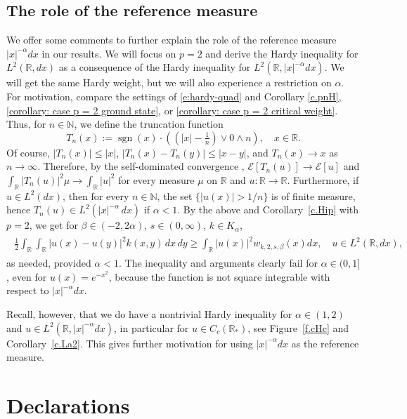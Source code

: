 \documentclass[12pt, a4paper]{amsart}
\newcommand{\R}{\mathbb{R}}
\newcommand{\E}{\mathcal{E}}
\begin{document}
\subsection{The role of the reference measure}\label{ss.uorm}
We offer some comments to further explain the role of the reference measure $|x|^{-\alpha}dx$ in our results. %
We will focus on $p=2$ and derive the Hardy inequality for $L^2(\R,dx)$ as a consequence of the Hardy inequality for $L^2(\R, |x|^{-\alpha}dx)$. We will get the same Hardy weight, but we will also experience a restriction on $\alpha$. For motivation, compare the settings of \eqref{e:hardy-quad} and Corollary \ref{c.pnH}, \ref{corollary: case p = 2 ground state}, or \ref{corollary: case p = 2 critical weight}.
Thus, for \( n \in \mathbb{N} \), we define the truncation function
\[
T_n(x) := \operatorname{sgn}(x) \cdot \left( \left(|x| - \tfrac{1}{n} \right) \vee 0 \wedge n \right),\quad x\in \R.
\]
Of course, $|T_n(x)|\le |x|$, $|T_n(x)-T_n(y)|\le |x-y|$, and $T_n(x)\to x$ as $n\to \infty$. Therefore, by the self-dominated convergence \cite[Lemma 6]{MR4372148}, $\E[T_n(u)]\to \E[u]$ and $\int_\R |T_n(u)|^2\mu\to \int_\R |u|^2$ for every measure $\mu$ on $\R$ and $u:\R\to \R$.
Furthermore, if $u\in L^2(dx)$, then for every $n\in \mathbb N$, the set $\{|u(x)|>1/n\}$ is of finite measure, hence $T_n(u)\in L^2(|x|^{-\alpha}\,dx)$ if $\alpha< 1$.
By the above and Corollary~\ref{c.Hip} with $p=2$, we get for $\beta \in (-2, 2\alpha)$, $s \in (0, \infty)$, $k \in K_\alpha$, 
\begin{align}
\label{equation: hardy inequality V dx}
\begin{split}
        \frac{1}{2}\int_{\R}\int_{\R}|u(x)-u(y)|^2 k(x, y)\,dx\,dy \geq \int_{\R}|u(x)|^2 w_{k, 2, s, \beta}(x)dx, \quad u\in L^2(\R,dx), 
\end{split}
\end{align}
as needed, provided $\alpha< 1$.
The inequality and arguments clearly fail for $\alpha\in (0,1]$, even for $u(x)=e^{-x^2}$, because the function is not square integrable with respect to $|x|^{-\alpha}dx$.

Recall, however, that we do have a nontrivial Hardy inequality for $\alpha\in (1,2)$ and $u\in L^2(\R,|x|^{-\alpha}dx)$, in particular for $u\in C_c(\R_*)$, see Figure~\ref{f.cHc} and Corollary~\ref{c.La2}. This gives further  motivation for using  $|x|^{-\alpha}dx$ as the reference measure. 
\section*{Declarations}
\end{document}
